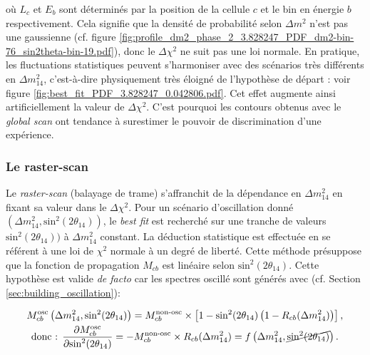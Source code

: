 \bigbreak

où $L_c$ et $E_b$ sont déterminés par la position de la cellule $c$ et le bin en énergie $b$ respectivement. Cela signifie que la densité de probabilité selon $\Delta m^2$ n'est pas une gaussienne (cf. figure \ref{fig:profile_dm2_phase_2_3.828247_PDF_dm2-bin-76_sin2theta-bin-19.pdf}), donc le $\Delta \chi^2$ ne suit pas une loi normale. En pratique, les fluctuations statistiques peuvent s'harmoniser avec des scénarios très différents en $\Delta m^2_{14}$, c'est-à-dire physiquement très éloigné de l'hypothèse de départ : voir figure \ref{fig:best_fit_PDF_3.828247_0.042806.pdf}. Cet effet augmente ainsi artificiellement la valeur de $\Delta \chi^2$. C'est pourquoi les contours obtenus avec le \textit{global scan} ont tendance à surestimer le pouvoir de discrimination d'une expérience.\\

\subsubsection*{Le raster-scan}

Le \og \textit{raster-scan} \fg{} (balayage de trame) s'affranchit de la dépendance en $\Delta m_{14}^2$ en fixant sa valeur dans le $\Delta \chi^2$. Pour un scénario d'oscillation donné $(\Delta m_{14}^2, \textrm{sin}^2(2\theta_{14}))$, le \textit{best fit} est recherché sur une tranche de valeurs $\textrm{sin}^2(2\theta_{14}))$ à $\Delta m_{14}^2$ constant. La déduction statistique est effectuée en se référent à une loi de $\chi^2$ normale à un degré de liberté. Cette méthode présuppose que la fonction de propagation $M_{cb}$ est linéaire selon $\textrm{sin}^2(2\theta_{14})$. Cette hypothèse est valide \textit{de facto} car les spectres oscillé sont générés avec (cf. Section \ref{sec:building_oscillation}):

\begin{equation}
\begin{gathered}
    M_{cb}^\textrm{osc} \left(\Delta m_{14}^2, \textrm{sin}^2(2\theta_{14})\right) = M_{cb}^\textrm{non-osc} \times \left[1 - \textrm{sin}^2(2\theta_{14}) \left( 1 - R_{cb}(\Delta m_{14}^2) \right)\right],\\
    \textrm{donc : } \frac{\partial M_{cb}^\textrm{osc}}{\partial \textrm{sin}^2(2\theta_{14})} = - M_{cb}^\textrm{non-osc} \times R_{cb}(\Delta m_{14}^2) = f\left(\Delta m^2_{14}, \cancel{\textrm{sin}^2(2\theta_{14})} \right).
\end{gathered}
\end{equation}

